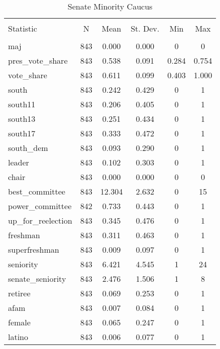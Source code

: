 \documentclass[12pt]{article}
\begin{document}

\begin{table}[ht] \centering 
	\caption{Senate Minority Caucus} 
	\label{} 
	\begin{tabular}{@{\extracolsep{5pt}}lccccc} 
		\\[-1.8ex]\hline 
		\hline \\[-1.8ex] 
		Statistic & \multicolumn{1}{c}{N} & \multicolumn{1}{c}{Mean} & \multicolumn{1}{c}{St. Dev.} & \multicolumn{1}{c}{Min} & \multicolumn{1}{c}{Max} \\ 
		\hline \\[-1.8ex] 
		maj & 843 & 0.000 & 0.000 & 0 & 0 \\ 
		pres\_vote\_share & 843 & 0.538 & 0.091 & 0.284 & 0.754 \\ 
		vote\_share & 843 & 0.611 & 0.099 & 0.403 & 1.000 \\ 
		south & 843 & 0.242 & 0.429 & 0 & 1 \\ 
		south11 & 843 & 0.206 & 0.405 & 0 & 1 \\ 
		south13 & 843 & 0.251 & 0.434 & 0 & 1 \\ 
		south17 & 843 & 0.333 & 0.472 & 0 & 1 \\ 
		south\_dem & 843 & 0.093 & 0.290 & 0 & 1 \\ 
		leader & 843 & 0.102 & 0.303 & 0 & 1 \\ 
		chair & 843 & 0.000 & 0.000 & 0 & 0 \\ 
		best\_committee & 843 & 12.304 & 2.632 & 0 & 15 \\ 
		power\_committee & 842 & 0.733 & 0.443 & 0 & 1 \\ 
		up\_for\_reelection & 843 & 0.345 & 0.476 & 0 & 1 \\ 
		freshman & 843 & 0.311 & 0.463 & 0 & 1 \\ 
		superfreshman & 843 & 0.009 & 0.097 & 0 & 1 \\ 
		seniority & 843 & 6.421 & 4.545 & 1 & 24 \\ 
		senate\_seniority & 843 & 2.476 & 1.506 & 1 & 8 \\ 
		retiree & 843 & 0.069 & 0.253 & 0 & 1 \\ 
		afam & 843 & 0.007 & 0.084 & 0 & 1 \\ 
		female & 843 & 0.065 & 0.247 & 0 & 1 \\ 
		latino & 843 & 0.006 & 0.077 & 0 & 1 \\ 

\end{tabular}
\end{table}
\end{document}
